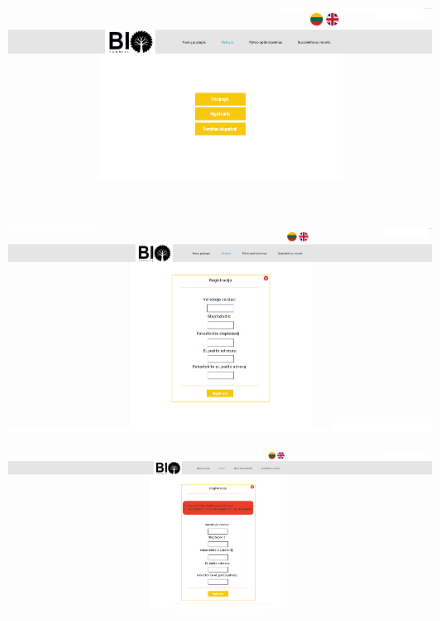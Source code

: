 \documentclass[a4paper,12pt]{article}
\begin{document}
\begin{figure}[!tph]
\hspace{-3cm}
\centering
\includegraphics[scale=0.5]{interfeisai/paskyrosPuslapisNeprisijungta}
\label{fig:verticalcell}
\end{figure}

\begin{figure}[!tph]
\hspace{-3cm}
\centering
\includegraphics[scale=0.5]{interfeisai/paskyrosPuslapisRegistracija}
\label{fig:verticalcell}
\end{figure}

\begin{figure}[!tph]
\hspace{-3cm}
\centering
\includegraphics[scale=0.5]{interfeisai/paskyrosPuslapisRegistracijaSuKlaida}
\label{fig:verticalcell}
\end{figure}
\end{document}
